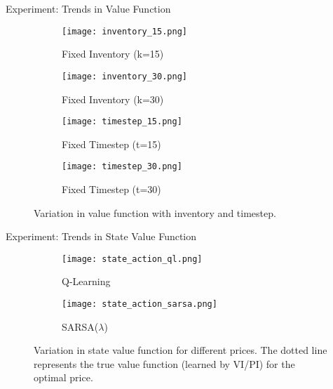 \begin{frame}{Experiment: Trends in Value Function}
\begin{figure}
    \centering
    \begin{subfigure}{0.35\textwidth}
        \centering
        \texttt{[image: inventory\_15.png]}
        \caption{Fixed Inventory (k=15)}
    \end{subfigure}
    \begin{subfigure}{0.35\textwidth}
        \centering
        \texttt{[image: inventory\_30.png]}
        \caption{Fixed Inventory (k=30)}
    \end{subfigure}
    \begin{subfigure}{0.35\textwidth}
        \centering
        \texttt{[image: timestep\_15.png]}
        \caption{Fixed Timestep (t=15)}
    \end{subfigure}
    \begin{subfigure}{0.35\textwidth}
        \centering
        \texttt{[image: timestep\_30.png]}
        \caption{Fixed Timestep (t=30)}
    \end{subfigure}
    \caption{Variation in value function with inventory and timestep.}
\end{figure}
\end{frame}

\begin{frame}{Experiment: Trends in State Value Function}
\begin{figure}
    \centering
    \begin{subfigure}{0.35\textwidth}
        \centering
        \texttt{[image: state\_action\_ql.png]}
        \caption{Q-Learning}
    \end{subfigure}
    \begin{subfigure}{0.35\textwidth}
        \centering
        \texttt{[image: state\_action\_sarsa.png]}
        \caption{SARSA($\lambda$)}
    \end{subfigure}
    \caption{Variation in state value function for different prices. The dotted line represents the true value function (learned by VI/PI) for the optimal price.}
\end{figure}
\end{frame}

